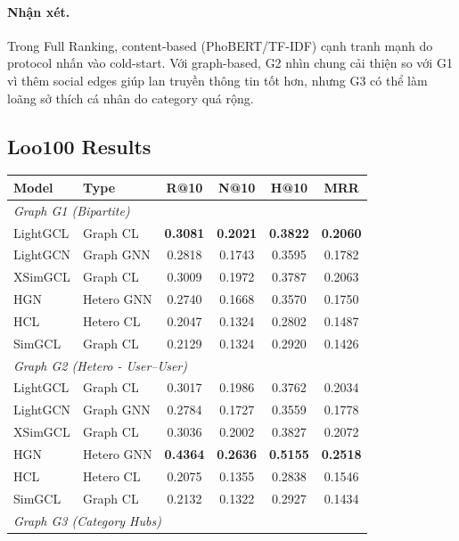 \documentclass[11pt]{article}
\begin{document}
\paragraph{Nhận xét.}
Trong Full Ranking, content-based (PhoBERT/TF-IDF) cạnh tranh mạnh do protocol nhấn vào cold-start. Với graph-based, G2 nhìn chung cải thiện so với G1 vì thêm social edges giúp lan truyền thông tin tốt hơn, nhưng G3 có thể làm loãng sở thích cá nhân do category quá rộng.

\subsection{Loo100 Results}
\begin{table}[t]
\centering
\scriptsize
\setlength{\tabcolsep}{3pt}
\renewcommand{\arraystretch}{1.02}
\begin{tabular}{l l c c c c}
\toprule
\textbf{Model} & \textbf{Type} & \textbf{R@10} & \textbf{N@10} & \textbf{H@10} & \textbf{MRR} \\
\midrule
\multicolumn{6}{l}{\textit{Graph G1 (Bipartite)}}\\
LightGCL  & Graph CL & \textbf{0.3081} & \textbf{0.2021} & \textbf{0.3822} & \textbf{0.2060} \\
LightGCN  & Graph GNN& 0.2818 & 0.1743 & 0.3595 & 0.1782 \\
XSimGCL   & Graph CL & 0.3009 & 0.1972 & 0.3787 & 0.2063 \\
HGN       & Hetero GNN & 0.2740 & 0.1668 & 0.3570 & 0.1750 \\
HCL       & Hetero CL  & 0.2047 & 0.1324 & 0.2802 & 0.1487 \\
SimGCL    & Graph CL & 0.2129 & 0.1324 & 0.2920 & 0.1426 \\
\midrule
\multicolumn{6}{l}{\textit{Graph G2 (Hetero - User--User)}}\\
LightGCL  & Graph CL & 0.3017 & 0.1986 & 0.3762 & 0.2034 \\
LightGCN  & Graph GNN& 0.2784 & 0.1727 & 0.3559 & 0.1778 \\
XSimGCL   & Graph CL & 0.3036 & 0.2002 & 0.3827 & 0.2072 \\
HGN       & Hetero GNN & \textbf{0.4364} & \textbf{0.2636} & \textbf{0.5155} & \textbf{0.2518} \\
HCL       & Hetero CL  & 0.2075 & 0.1355 & 0.2838 & 0.1546 \\
SimGCL    & Graph CL & 0.2132 & 0.1322 & 0.2927 & 0.1434 \\
\midrule
\multicolumn{6}{l}{\textit{Graph G3 (Category Hubs)}}\\

\end{tabular}
\end{table}
\end{document}

